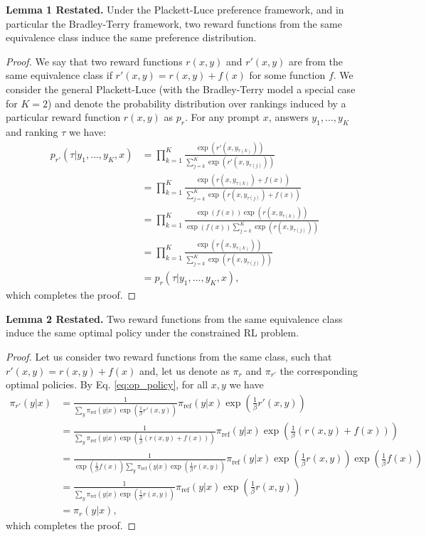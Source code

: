 \documentclass{article}
\newcommand{\piref}{\pi_\text{ref}}
\begin{document}
\begin{em}
{\bf Lemma 1 Restated.} Under the Plackett-Luce preference framework, and in particular the Bradley-Terry framework, two reward functions from the same equivalence class induce the same preference distribution.
\end{em}
\begin{proof}
We say that two reward functions $r(x, y)$ and $r'(x, y)$ are from the same equivalence class if $r'(x, y) = r(x, y) + f(x)$ for some function $f$. We consider the general Plackett-Luce (with the Bradley-Terry model a special case for $K=2$) and denote the probability distribution over rankings induced by a particular reward function $r(x, y)$ as $p_r$. For any prompt $x$, answers $y_1,\ldots, y_K$ and ranking $\tau$ we have:
\begin{align*}
    p_{r'}(\tau| y_1,\ldots, y_K, x) &= 
     \prod_{k=1}^{K}\frac{\exp(r'(x, y_{\tau(k)}))}{\sum_{j=k}^{K}\exp(r'(x, y_{\tau(j)}))} \\
     &= \prod_{k=1}^{K}\frac{\exp(r(x, y_{\tau(k)}) + f(x))}{\sum_{j=k}^{K}\exp(r(x, y_{\tau(j)})+f(x))} \\
     &= \prod_{k=1}^{K}\frac{\exp(f(x))\exp(r(x, y_{\tau(k)}))}{\exp(f(x))\sum_{j=k}^{K}\exp(r(x, y_{\tau(j)}))} \\
     &= \prod_{k=1}^{K}\frac{\exp(r(x, y_{\tau(k)}))}{\sum_{j=k}^{K}\exp(r(x, y_{\tau(j)}))} \\
     &= p_{r}(\tau| y_1,\ldots, y_K, x),
\end{align*}
which completes the proof.
\end{proof}

\begin{em}
{\bf Lemma 2 Restated.} Two reward functions from the same equivalence class induce the same optimal policy under the constrained RL problem.
\end{em}
\begin{proof}
Let us consider two reward functions from the same class, such that $r'(x, y)=r(x, y)+f(x)$ and, let us denote as $\pi_r$ and $\pi_{r'}$ the corresponding optimal policies. By Eq. \ref{eq:op_policy}, for all $x, y$ we have
\begin{align*}
    \pi_{r'}(y|x) &= \frac{1}{\sum_{y}\piref(y|x)\exp\left(\frac{1}{\beta}r'(x, y)\right)}\piref(y|x)\exp\left(\frac{1}{\beta}r'(x, y)\right) \\
    &= \frac{1}{\sum_{y}\piref(y|x)\exp\left(\frac{1}{\beta}(r(x, y) + f(x))\right)}\piref(y|x)\exp\left(\frac{1}{\beta}(r(x, y)+f(x))\right) \\
    &= \frac{1}{\exp\left(\frac{1}{\beta}f(x)\right)\sum_{y}\piref(y|x)\exp\left(\frac{1}{\beta}r(x, y)\right)}\piref(y|x)\exp\left(\frac{1}{\beta}r(x, y)\right)\exp\left(\frac{1}{\beta}f(x)\right) \\
    &= \frac{1}{\sum_{y}\piref(y|x)\exp\left(\frac{1}{\beta}r(x, y)\right)}\piref(y|x)\exp\left(\frac{1}{\beta}r(x, y)\right) \\
    &= \pi_r(y|x),
\end{align*}
which completes the proof.
\end{proof}
\end{document}
